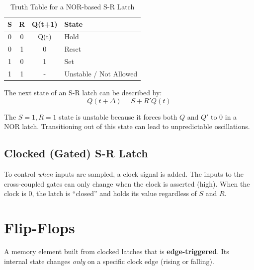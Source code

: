 \begin{table}[h]
\centering
\vspace{10pt}
\begin{center}
\begin{tabular}{cccl}
\toprule
\textbf{S} & \textbf{R} & \textbf{Q(t+1)} & \textbf{State} \\
\midrule
0 & 0 & Q(t) & Hold \\
0 & 1 & 0 & Reset \\
1 & 0 & 1 & Set \\
1 & 1 & - & Unstable / Not Allowed \\
\bottomrule
\end{tabular}
\end{center}
\vspace{10pt}
\caption{Truth Table for a NOR-based S-R Latch}
\end{table}

\begin{proposition}
The next state of an S-R latch can be described by:
\begin{equation}
    Q(t+\Delta) = S + R' Q(t)
\end{equation}
\end{proposition}

\begin{remark}
The $S=1, R=1$ state is unstable because it forces both $Q$ and $Q'$ to 0 in a NOR latch. Transitioning out of this state can lead to unpredictable oscillations.
\end{remark}

\subsection{Clocked (Gated) S-R Latch}

To control \textit{when} inputs are sampled, a clock signal is added. The inputs to the cross-coupled gates can only change when the clock is asserted (high). When the clock is 0, the latch is ``closed'' and holds its value regardless of $S$ and $R$.

\section{Flip-Flops}

\begin{definition}
A memory element built from clocked latches that is \textbf{edge-triggered}. Its internal state changes \textit{only} on a specific clock edge (rising or falling).
\end{definition}

